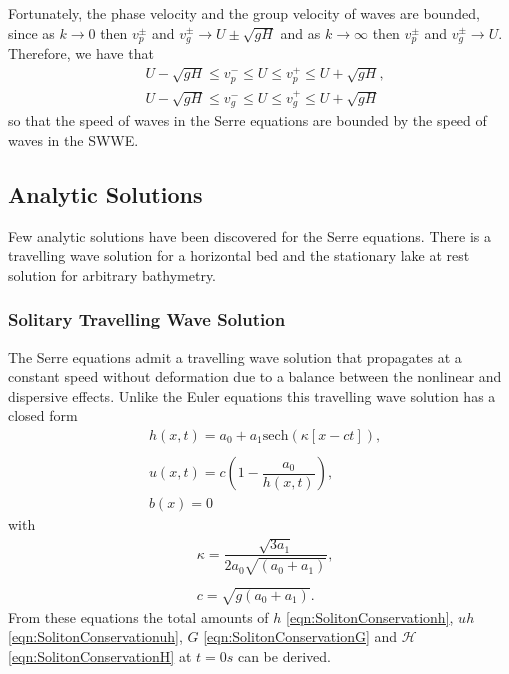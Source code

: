 Fortunately, the phase velocity and the group velocity of waves are bounded, since as $k \rightarrow 0$ then $v_p^\pm$ and $v_g^\pm \rightarrow U \pm \sqrt{gH}$ and as $k \rightarrow \infty$ then $v_p^\pm$ and $v_g^\pm \rightarrow U$. Therefore, we have that
\begin{subequations}
\begin{align}
&U - \sqrt{gH} \le v_p^- \le U \le v_p^+ \le U + \sqrt{gH}, \\
&U - \sqrt{gH} \le v_g^- \le U \le v_g^+ \le U + \sqrt{gH}
\end{align}
\label{eqn:WaveVelocitiesBound}
\end{subequations}
so that the speed of waves in the Serre equations are bounded by the speed of waves in the SWWE.

\subsection{Analytic Solutions}
Few analytic solutions have been discovered for the Serre equations. There is a travelling wave solution for a horizontal bed \cite{El-etal-2006} and the stationary lake at rest solution for arbitrary bathymetry.


\subsubsection{Solitary Travelling Wave Solution}
The Serre equations admit a travelling wave solution that propagates at a constant speed without deformation due to a balance between the nonlinear and dispersive effects. Unlike the Euler equations this travelling wave solution has a closed form
\begin{subequations}
	\begin{align}
	&h(x,t) = a_0 + a_1\text{sech}\left(\kappa \left[x - ct\right]\right), \\  \nonumber \\
	&u(x,t) = c\left(1 - \dfrac{a_0}{h(x,t)}\right), \\
	&b(x) = 0
	\end{align}
	\label{eqn:Solitondefhub}
\end{subequations}
with
\begin{align*}
&\kappa = \dfrac{\sqrt{3a_1}}{2 a_0\sqrt{\left(a_0 + a_1\right)}}, \\ \\
&c = \sqrt{g(a_0 + a_1)}.
\end{align*}
From these equations the total amounts of $h$ \eqref{eqn:SolitonConservationh}, $uh$ \eqref{eqn:SolitonConservationuh}, $G$ \eqref{eqn:SolitonConservationG} and $\mathcal{H}$ \eqref{eqn:SolitonConservationH} at $t=0s$ can be derived.

